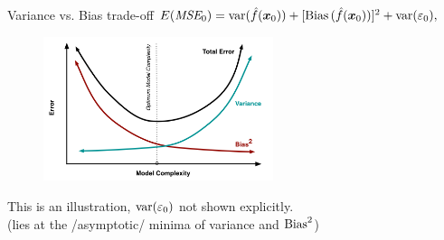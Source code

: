 \documentclass{beamer}
\begin{document}
\begin{frame}{Variance vs. Bias trade-off}
$E(\textit{MSE}_0)
   = \textnormal{var}(\hat{f}(\bm{x}_0))
   + [\textnormal{Bias\,}(\hat{f}(\bm{x}_0))]^2
   + \textnormal{var}(\varepsilon_0),$\\
\begin{figure}
\includegraphics[width=0.6\textwidth]{img/biasvariance.png}
\end{figure}
\small{This is an illustration, $\textnormal{var}(\varepsilon_0)$ not shown explicitly. \\(lies at the /asymptotic/ minima of variance and $\textnormal{Bias}^2$)}
\end{frame}
\end{document}
